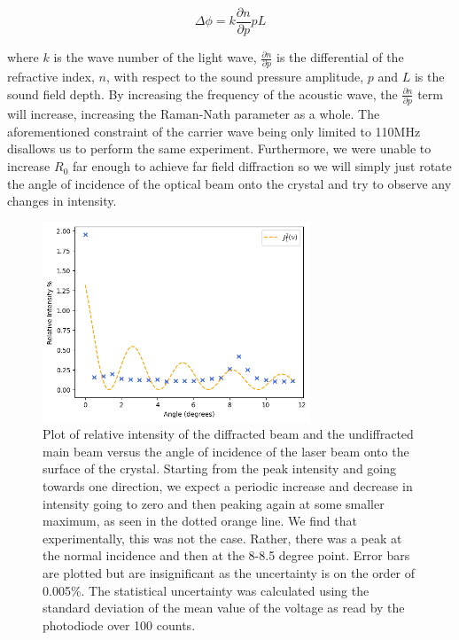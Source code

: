 \documentclass[aps,prl,reprint,10pt,amsmath,amssymb,superscriptaddress,a4paper]{revtex4-2}
\begin{document}
\begin{equation}
    \Delta \phi = k \frac{\partial n}{\partial p}p L
\end{equation}

where $k$ is the wave number of the light wave, $\frac{\partial n}{\partial p}$ is the differential of the refractive index, $n$, with respect to the sound pressure amplitude, $p$ and $L$ is the sound 
field depth. By increasing the frequency of the acoustic wave, the $\frac{\partial n}{\partial p}$ term will increase, increasing the Raman-Nath parameter as a whole. The aforementioned constraint of the 
carrier wave being only limited to 110MHz disallows us to perform the same experiment. Furthermore, we were unable to increase $R_0$ far enough to achieve far field diffraction so we will simply just rotate 
the angle of incidence of the optical beam onto the crystal and try to observe any changes in intensity.

\begin{figure}[!htbp]
    \includegraphics[width = 8cm]{../Figures/intensity.png}
    \caption{Plot of relative intensity of the diffracted beam and the undiffracted main beam versus the angle of incidence of the laser beam onto the 
    surface of the crystal. Starting from the peak intensity and going towards one direction, we expect a periodic increase and 
    decrease in intensity going to zero and then peaking again at some smaller maximum, as seen in the dotted orange line. We find that experimentally, 
    this was not the case. Rather, there was a peak at the normal incidence and then at the 8-8.5 degree point. Error bars are plotted but are insignificant 
    as the uncertainty is on the order of 0.005\%. The statistical uncertainty was calculated using the standard deviation of the mean value of the voltage 
    as read by the photodiode over 100 counts.}
    \label{fig:intensity}
\end{figure}
\end{document}
